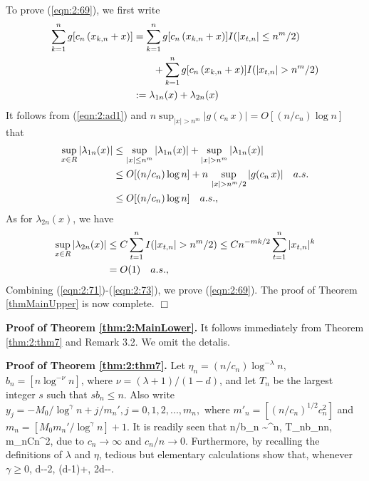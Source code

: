 To prove (\ref {eqn:2:69}), we first write
\begin{align}
\sum_{k=1}^{n}g[c_{n}\,(x_{k,n}+x)] &= \sum_{k=1}^{n}g[c_{n}\,(x_{k,n}+x)] I(|x_{t,n}| \le n^{m}/2)  \no\\
&\qquad + \sum_{k=1}^{n}g[c_{n}\,(x_{k,n}+x)] I(|x_{t,n}| > n^{m}/2) \no\\
&:= \lambda_{1n}(x) + \lambda_{2n}(x) \la {eqn:2:71}
\end{align}
It follows from (\ref {eqn:2:ad1}) and $n \sup_{|x| > n^{m}}|g(c_n \, x)| = O[(n/c_n) \log n]$ that
\begin{align}
\sup_{x\in R} |\lambda_{1n}(x) |&\le \sup_{|x| \le n^{m}} |\lambda_{1n}(x)| + \sup_{|x| > n^{m}} | \lambda_{1n}(x) | \no\\
&\le O[(n/c_n)\log n] + n \, \sup_{|x| > n^{m}/2} | g(c_n \, x)| \quad a.s.  \no\\
&\le O[(n/c_n)\log n] \quad a.s., \la {eqn:2:72}
\end{align}
As for $\lambda_{2n}(x)$, we have
\begin{align}
\sup_{x\in R} |\lambda_{2n}(x)| &\le C \sum_{t = 1}^n  I(| x_{t,n}| > n^{m}/2)  \le C n^{-m k/2} \sum_{t = 1}^n  |x_{t,n}|^{k} \no\\
& = O(1) \quad a.s., \la {eqn:2:73}
\end{align}
Combining (\ref {eqn:2:71})-(\ref {eqn:2:73}), we prove (\ref {eqn:2:69}).
The proof of Theorem \ref {thmMainUpper} is now complete. $\Box$

\medskip
{\bf Proof of Theorem \ref {thm:2:MainLower}.}  It follows immediately from Theorem \ref {thm:2:thm7} and Remark 3.2. We omit the detalis.

 \medskip
 {\bf Proof of Theorem \ref {thm:2:thm7}.}
Let $\eta_n=(n/c_n)\log^{-\lambda}n,$ $b_n = [n \log^{-\nu} n]$, where $\nu=(\lambda+1)/(1-d)$, and let $T_n$ be the largest integer $s$ such that $s b_n \le n$. Also write  $y_j = -M_0/\log^\gamma n +  j/  m_n',  j = 0,1,2,...,m_n,$ where $m'_n = [(n/c_n)^{1/2} c_n^2]$ and $m_n= [M_0m_n'/\log^\gamma n]+1$. It is readily seen that
\be
n/b_n \sim  \log^\nu n, \quad T_nb_n\le n, \quad m_n\le Cn^2, 
\ee
due to $c_n\to\infty$ and $c_n/n\to 0$. Furthermore, by recalling the definitions of $\lambda$ and $\eta$, tedious but elementary calculations show that, whenever $\gamma\ge 0$,
\be
d\nu-\eta {}-2\lambda, \quad (d-1)\nu+\lambda{}, \quad 2d\nu-\gamma{}-\lambda. 
\ee


